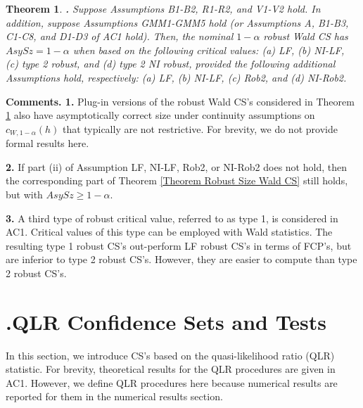 \documentclass[12pt,titlepage,final,oneside,letterpaper]{article}
\newtheorem{theorem}{Theorem}[section]
\begin{document}
\begin{theorem}
\hspace{-0.08in}\textbf{.} \label{Theorem Robust Size Wald CS}Suppose
Assumptions \emph{B1-B2, R1-R2, }and \emph{V1-V2 hold. }In addition, suppose
Assumptions \emph{GMM1-GMM5 }hold \emph{(}or Assumptions \emph{A,} \emph{%
B1-B3,} \emph{C1-C8,} and \emph{D1-D3} of \emph{AC1 }hold\emph{). }Then, the
nominal $1-\alpha $ robust Wald CS has $AsySz=1-\alpha $ when based on the
following critical values\emph{:} \emph{(a) LF,} \emph{(b) NI-LF, (c) }type 
\emph{2} robust, and \emph{(d) }type \emph{2} \emph{NI} robust, provided the
following additional Assumptions hold, respectively\emph{:} \emph{(a) LF,
(b) NI-LF,} \emph{(c) Rob2, }and \emph{(d) NI-Rob2.}
\end{theorem}

\noindent \textbf{Comments. 1. }Plug-in versions of the robust Wald CS's
considered in Theorem \ref{Theorem Robust Size Wald CS} also have
asymptotically correct size under continuity assumptions on $c_{W,1-\alpha
}(h)$ that typically are not restrictive. For brevity, we do not provide
formal results here.

\noindent \textbf{2. }If part (ii) of Assumption LF, NI-LF, Rob2, or NI-Rob2
does not hold, then the corresponding part of Theorem \ref{Theorem Robust
Size Wald CS} still holds, but with $AsySz\geq 1-\alpha .$

\noindent \textbf{3. }A third type of robust critical value, referred to as
type 1, is considered in AC1. Critical values of this type can be employed
with Wald statistics. The resulting type 1 robust CS's out-perform LF robust
CS's in terms of FCP's, but are inferior to type 2 robust CS's. However,
they are easier to compute than type 2 robust CS's.

\section{ \hspace{-0.34in}\textbf{.}\hspace{0.2in}QLR Confidence Sets and
Tests\label{QLR Tests Sec}}

\setcounter{equation}{0}\hspace{0.25in}In this section, we introduce CS's
based on the quasi-likelihood ratio (QLR) statistic. For brevity,
theoretical results for the QLR procedures are given in AC1. However, we
define QLR procedures here because numerical results are reported for them
in the numerical results section.
\end{document}
